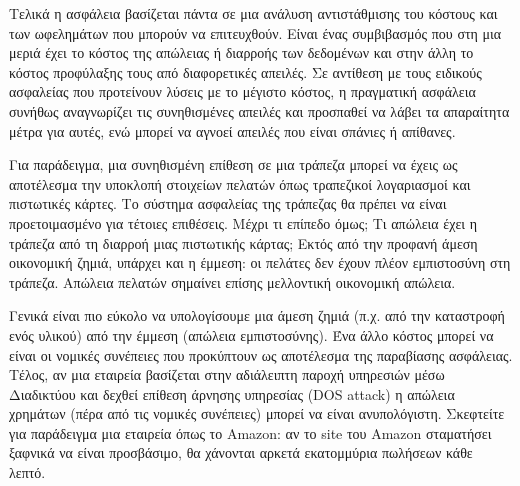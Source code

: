 Τελικά η ασφάλεια βασίζεται πάντα σε μια ανάλυση αντιστάθμισης του κόστους και των ωφελημάτων που μπορούν να επιτευχθούν. Είναι ένας συμβιβασμός που στη μια μεριά έχει το κόστος της απώλειας ή διαρροής των δεδομένων και στην άλλη το κόστος προφύλαξης τους από διαφορετικές απειλές. Σε αντίθεση με τους ειδικούς ασφαλείας που προτείνουν λύσεις με το μέγιστο κόστος, η πραγματική ασφάλεια συνήθως αναγνωρίζει τις συνηθισμένες απειλές και προσπαθεί να λάβει τα απαραίτητα μέτρα για αυτές, ενώ μπορεί να αγνοεί απειλές που είναι σπάνιες ή απίθανες.

Για παράδειγμα, μια συνηθισμένη επίθεση σε μια τράπεζα μπορεί να έχεις ως αποτέλεσμα την υποκλοπή στοιχείων πελατών όπως τραπεζικοί λογαριασμοί και πιστωτικές κάρτες. Το σύστημα ασφαλείας της τράπεζας θα πρέπει να είναι προετοιμασμένο για τέτοιες επιθέσεις. Μέχρι τι επίπεδο όμως; Τι απώλεια έχει η τράπεζα από τη διαρροή μιας πιστωτικής κάρτας; Εκτός από την προφανή άμεση οικονομική ζημιά, υπάρχει και η έμμεση: οι πελάτες δεν έχουν πλέον εμπιστοσύνη στη τράπεζα. Απώλεια πελατών σημαίνει επίσης μελλοντική οικονομική απώλεια. 

Γενικά είναι πιο εύκολο να υπολογίσουμε μια άμεση ζημιά  (π.χ. από την καταστροφή ενός υλικού) από την έμμεση (απώλεια εμπιστοσύνης). Ένα άλλο κόστος μπορεί να είναι οι νομικές συνέπειες που προκύπτουν ως αποτέλεσμα της παραβίασης ασφάλειας. Τέλος, αν μια εταιρεία βασίζεται στην αδιάλειπτη παροχή υπηρεσιών μέσω Διαδικτύου και δεχθεί επίθεση άρνησης υπηρεσίας (DOS attack) η απώλεια χρημάτων (πέρα από τις νομικές συνέπειες) μπορεί να είναι ανυπολόγιστη. Σκεφτείτε για παράδειγμα μια εταιρεία όπως το Amazon: αν το site του Amazon σταματήσει ξαφνικά να είναι προσβάσιμο, θα χάνονται αρκετά εκατομμύρια πωλήσεων κάθε λεπτό.


